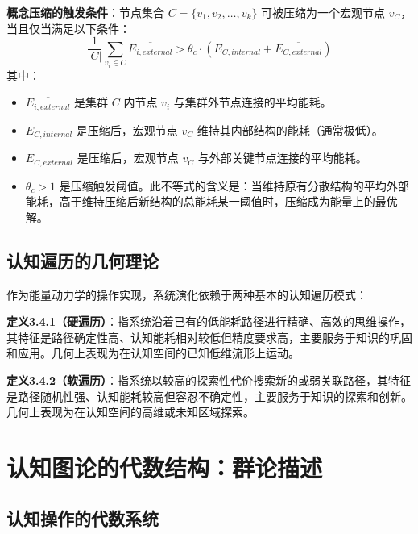 \documentclass[12pt,a4paper]{article}
\begin{document}
\textbf{概念压缩的触发条件}：节点集合 $C = \{v_1, v_2, \ldots, v_k\}$ 可被压缩为一个宏观节点 $v_C$，当且仅当满足以下条件：
\begin{equation}
\frac{1}{|C|}\sum_{v_i \in C} \overline{E_{i, external}} > \theta_c \cdot (E_{C, internal} + \overline{E_{C, external}})
\label{eq:compression_condition}
\end{equation}
其中：
\begin{itemize}
    \item $\overline{E_{i, external}}$ 是集群 $C$ 内节点 $v_i$ 与集群外节点连接的平均能耗。
    \item $E_{C, internal}$ 是压缩后，宏观节点 $v_C$ 维持其内部结构的能耗（通常极低）。
    \item $\overline{E_{C, external}}$ 是压缩后，宏观节点 $v_C$ 与外部关键节点连接的平均能耗。
    \item $\theta_c > 1$ 是压缩触发阈值。此不等式的含义是：当维持原有分散结构的平均外部能耗，高于维持压缩后新结构的总能耗某一阈值时，压缩成为能量上的最优解。
\end{itemize}

\subsection{认知遍历的几何理论}

作为能量动力学的操作实现，系统演化依赖于两种基本的认知遍历模式：

\textbf{定义3.4.1（硬遍历）}：指系统沿着已有的低能耗路径进行精确、高效的思维操作，其特征是路径确定性高、认知能耗相对较低但精度要求高，主要服务于知识的巩固和应用。几何上表现为在认知空间的已知低维流形上运动。

\textbf{定义3.4.2（软遍历）}：指系统以较高的探索性代价搜索新的或弱关联路径，其特征是路径随机性强、认知能耗较高但容忍不确定性，主要服务于知识的探索和创新。几何上表现为在认知空间的高维或未知区域探索。

\section{认知图论的代数结构：群论描述}

\subsection{认知操作的代数系统}
\end{document}
